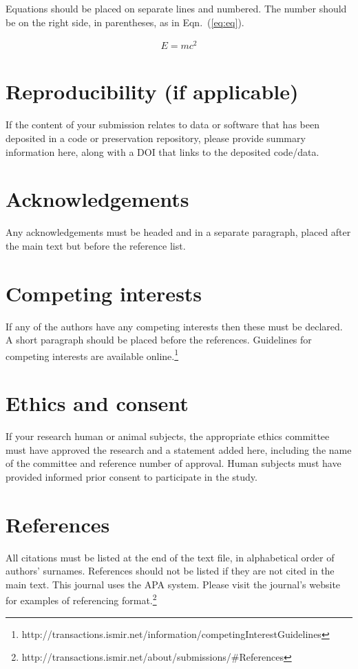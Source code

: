 \documentclass{article}
\begin{document}
Equations should be placed on separate lines and numbered.
The number should be on the right side, in parentheses,
as in Eqn.~(\ref{eq:eq}).

\begin{align}\label{eq:eq}
E = mc^2
\end{align}

\section{Reproducibility (if applicable)}

If the content of your submission relates to data or software
that has been deposited in a code or preservation repository,
please provide summary information here, along with a DOI that
links to the deposited code/data.

\section{Acknowledgements}

Any acknowledgements must be headed and in a separate paragraph,
placed after the main text but before the reference list.

\section{Competing interests}

If any of the authors have any competing interests then these
must be declared. A short paragraph should be placed before
the references.
Guidelines for competing interests are available online.\footnote{http://transactions.ismir.net/information/competingInterestGuidelines}

\section{Ethics and consent}

If your research human or animal subjects, the appropriate ethics
committee must have approved the research and a statement added here,
including the name of the committee and reference number of approval.
Human subjects must have provided informed prior consent
to participate in the study.

\section{References}

All citations must be listed at the end of the text file,
in alphabetical order of authors' surnames.
References should not be listed if they are not cited in
the main text.
This journal uses the APA system.
Please visit the journal's website
for examples of referencing format.\footnote{http://transactions.ismir.net/about/submissions/\#References}
\end{document}
